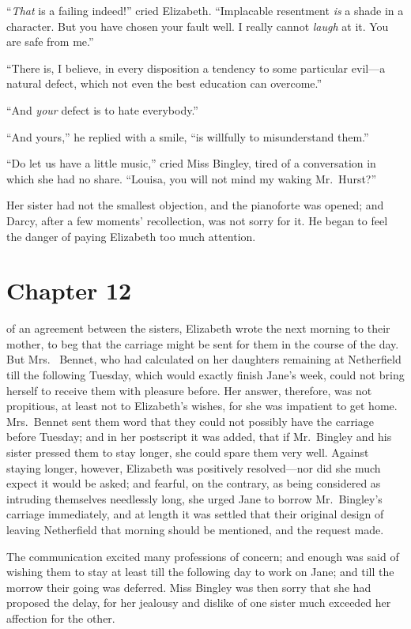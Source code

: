 ``\emph{That} is a failing indeed!'' cried Elizabeth.  ``Implacable
resentment \emph{is} a shade in a character.  But you have chosen your
fault well.  I really cannot \emph{laugh} at it.  You are safe from me.''

``There is, I believe, in every disposition a tendency to some
particular evil---a natural defect, which not even the best
education can overcome.''

``And \emph{your} defect is to hate everybody.''

``And yours,'' he replied with a smile, ``is willfully to
misunderstand them.''

``Do let us have a little music,'' cried Miss Bingley, tired of a
conversation in which she had no share.  ``Louisa, you will not
mind my waking Mr.\ Hurst?''

Her sister had not the smallest objection, and the pianoforte was
opened; and Darcy, after a few moments' recollection, was not
sorry for it.  He began to feel the danger of paying Elizabeth too
much attention.



\chapter{Chapter 12}


 of an agreement between the sisters, Elizabeth
wrote the next morning to their mother, to beg that the carriage
might be sent for them in the course of the day.  But Mrs.\ %
Bennet, who had calculated on her daughters remaining at
Netherfield till the following Tuesday, which would exactly
finish Jane's week, could not bring herself to receive them with
pleasure before.  Her answer, therefore, was not propitious, at
least not to Elizabeth's wishes, for she was impatient to get
home.  Mrs.\ Bennet sent them word that they could not possibly
have the carriage before Tuesday; and in her postscript it was
added, that if Mr.\ Bingley and his sister pressed them to stay
longer, she could spare them very well.  Against staying longer,
however, Elizabeth was positively resolved---nor did she much
expect it would be asked; and fearful, on the contrary, as being
considered as intruding themselves needlessly long, she urged
Jane to borrow Mr.\ Bingley's carriage immediately, and at
length it was settled that their original design of leaving
Netherfield that morning should be mentioned, and the request
made.

The communication excited many professions of concern; and
enough was said of wishing them to stay at least till the
following day to work on Jane; and till the morrow their going
was deferred.  Miss Bingley was then sorry that she had
proposed the delay, for her jealousy and dislike of one sister
much exceeded her affection for the other.

